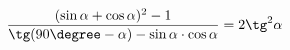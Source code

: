 \begin{ex}[type=prove_identity]
	\begin{condition}
		\( \dfrac{(\sin\alpha+\cos\alpha)^2-1}{\tg(90\degree-\alpha)-\sin\alpha\cdot\cos\alpha}=2\tg^2\alpha \)
	\end{condition}
\end{ex}